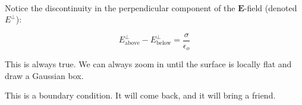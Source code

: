 \documentclass{article}
\numberwithin{equation}{section}
\newcommand{\bunny}[1][]{
    \tikz \fill [scale=1ex/500,yscale=1,#1] svg "M3831 8683 c-70 -71 -235 -358 -326 -567 -168 -385 -252 -748 -275 -1181 -5 -104 -9 -199 -7 -209 2 -16 -10 -21 -88 -36 -158 -31 -407 -112 -530 -173 -117 -58 -239 -150 -365 -277 -178 -177 -305 -366 -407 -604 -44 -102 -55 -118 -136 -201 -110 -113 -148 -183 -154 -288 -4 -53 0 -88 14 -132 12 -37 16 -70 12 -85 -4 -14 -7 -62 -8 -107 -3 -225 125 -386 369 -461 66 -20 157 -35 282 -47 l68 -7 -25 -47 c-41 -81 -59 -197 -52 -341 10 -200 66 -413 174 -660 153 -347 352 -632 640 -914 l104 -102 9 -95 c13 -131 12 -378 -1 -441 -25 -115 -92 -205 -180 -242 -138 -58 -168 -77 -220 -139 -92 -109 -110 -180 -63 -237 63 -75 165 -100 429 -107 159 -4 215 -2 275 11 267 57 455 273 539 619 20 84 29 107 41 103 8 -3 89 -37 179 -76 197 -86 466 -177 651 -220 74 -18 142 -34 150 -37 8 -3 -14 -15 -50 -28 -257 -88 -340 -205 -227 -319 48 -47 82 -58 257 -78 225 -26 1652 -9 1850 23 75 12 154 51 184 92 22 30 23 43 15 268 -3 65 0 83 25 133 50 102 131 161 255 187 46 9 67 8 150 -11 230 -54 428 -7 556 131 71 77 99 149 92 240 -7 115 -65 203 -185 282 -218 145 -282 308 -264 665 30 563 -100 1035 -383 1397 -78 99 -236 254 -335 327 -319 238 -731 392 -1245 468 -301 44 -438 49 -1090 37 -69 -2 -107 3 -160 20 l-70 22 3 238 c3 183 0 265 -12 356 -18 123 -53 275 -81 340 -16 38 -16 40 9 70 456 567 686 1088 725 1647 21 289 -41 691 -116 749 -28 23 -72 27 -106 10 -63 -31 -322 -342 -452 -541 -38 -59 -73 -108 -77 -108 -5 0 -8 11 -8 24 0 14 -9 74 -21 133 -44 228 -158 517 -217 547 -50 26 -80 20 -121 -21z";
}
\begin{document}
\begin{minipage}{0.4\textwidth}
\begin{flushleft}
\begin{figure}[H]
\label{fig:2:h}
\end{figure}
\end{flushleft}
\end{minipage}
~
\begin{minipage}{0.6\textwidth}
\begin{flushright}
\parbox[c]{\textwidth}{\begin{flushleft} Notice the discontinuity in the perpendicular component of the $\bm{E}$-field (denoted $E^{\perp}$): \end{flushleft}}
\parbox[c]{\textwidth}{\begin{equation*} \boxed{E_{\text{above}}^{\perp} - E_{\text{below}}^{\perp} = \frac{\sigma}{\epsilon_o}} \end{equation*}}
\parbox[c]{\textwidth}{\begin{flushleft} This is always true. We can always zoom in until the surface is locally flat and draw a Gaussian box. \end{flushleft}}
\end{flushright}
\end{minipage}

This is a boundary condition. It will come back, and it will bring a friend.
\end{document}
